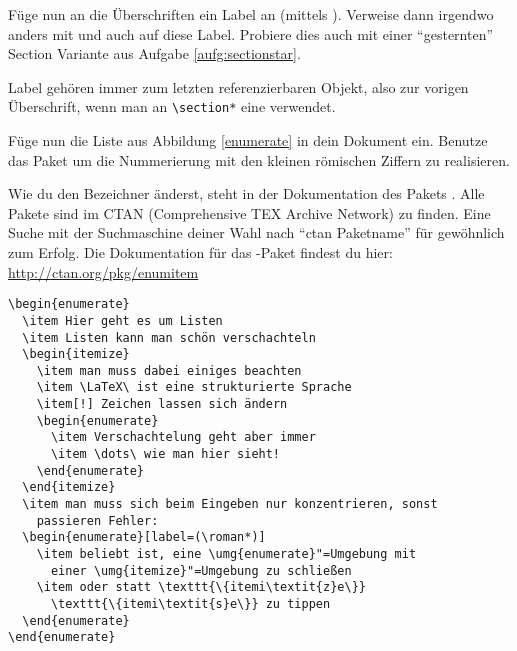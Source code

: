\begin{uebung}
\item Füge nun an die Überschriften ein Label an (mittels ).
    Verweise dann irgendwo anders mit  und auch
     auf diese Label. Probiere dies auch mit einer \enquote{gesternten}
    Section Variante aus Aufgabe \ref{aufg:sectionstar}.
    \begin{loesung}
        Label gehören immer zum letzten referenzierbaren Objekt, also zur vorigen Überschrift, wenn man an \verb|\section*| eine verwendet.
    \end{loesung}

\item Füge nun die Liste aus Abbildung \ref{enumerate} in dein Dokument ein.
    Benutze das Paket  um die Nummerierung mit den kleinen
    römischen Ziffern zu realisieren.
    \begin{hinweis}
        Wie du den Bezeichner änderst, steht in der Dokumentation des Pakets
        . Alle Pakete sind im CTAN (Comprehensive TEX Archive Network)
        zu finden. Eine Suche mit der Suchmaschine deiner Wahl nach
        \enquote{ctan Paketname} für gewöhnlich zum Erfolg. Die Dokumentation für
        das -Paket findest du hier: \url{http://ctan.org/pkg/enumitem}
    \end{hinweis}
    \begin{loesung}
\begin{verbatim}
\begin{enumerate}
  \item Hier geht es um Listen
  \item Listen kann man schön verschachteln
  \begin{itemize}
    \item man muss dabei einiges beachten
    \item \LaTeX\ ist eine strukturierte Sprache
    \item[!] Zeichen lassen sich ändern
    \begin{enumerate} 
      \item Verschachtelung geht aber immer
      \item \dots\ wie man hier sieht!
    \end{enumerate}
  \end{itemize}
  \item man muss sich beim Eingeben nur konzentrieren, sonst 
    passieren Fehler:
  \begin{enumerate}[label=(\roman*)]
    \item beliebt ist, eine \umg{enumerate}"=Umgebung mit 
      einer \umg{itemize}"=Umgebung zu schließen
    \item oder statt \texttt{\{itemi\textit{z}e\}} 
      \texttt{\{itemi\textit{s}e\}} zu tippen
  \end{enumerate}
\end{enumerate}
\end{verbatim}
    \end{loesung}


\end{uebung}
